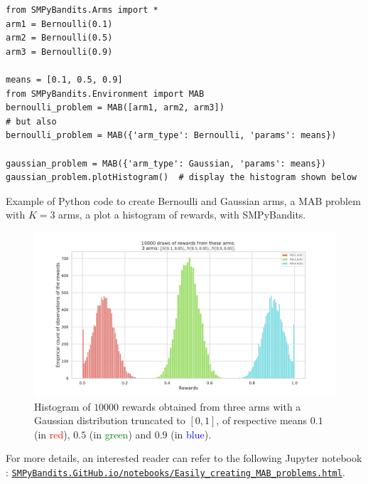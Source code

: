 \begin{small}
\begin{listing}[h!]
    \begin{verbatim}
from SMPyBandits.Arms import *
arm1 = Bernoulli(0.1)
arm2 = Bernoulli(0.5)
arm3 = Bernoulli(0.9)

means = [0.1, 0.5, 0.9]
from SMPyBandits.Environment import MAB
bernoulli_problem = MAB([arm1, arm2, arm3])
# but also
bernoulli_problem = MAB({'arm_type': Bernoulli, 'params': means})

gaussian_problem = MAB({'arm_type': Gaussian, 'params': means})
gaussian_problem.plotHistogram()  # display the histogram shown below
    \end{verbatim}
    \caption{Example of Python code to create Bernoulli and Gaussian arms, a MAB problem with $K=3$ arms, a plot a histogram of rewards, with SMPyBandits.}
    \label{lst:3:pythonCodeCreateProblem}
\end{listing}
\end{small}

\begin{figure}[h!]  %
	\centering
	\includegraphics[width=0.75\linewidth]{exampleOfRewards.pdf}
	\caption{Histogram of $10000$ \iid{} rewards obtained from three arms with a Gaussian distribution truncated to $[0,1]$, of respective means $0.1$ (in \textcolor{red}{red}), $0.5$ (in \textcolor{green}{green}) and $0.9$ (in \textcolor{blue}{blue}).}
	\label{fig:3:exampleOfRewards}
\end{figure}

For more details, an interested reader can refer to the following Jupyter notebook \cite{jupyter}:
\href{https://smpybandits.github.io/notebooks/Easily_creating_MAB_problems.html}{\texttt{SMPyBandits.GitHub.io/notebooks/Easily\_creating\_MAB\_problems.html}}.

